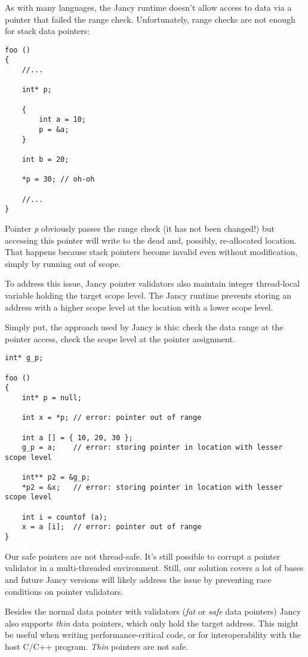 \documentclass[oneside]{book}
\begin{document}
As with many languages, the Jancy runtime doesn't allow access to data via a pointer that failed the range check. Unfortunately, range checks are not enough for stack data pointers:

\begin{lstlisting}
foo ()
{
    //...

    int* p;

    {
        int a = 10;
        p = &a;
    }

    int b = 20;

    *p = 30; // oh-oh

    //...
}
\end{lstlisting}

Pointer \emph{p} obviously passes the range check (it has not been changed!) but accessing this pointer will write to the dead and, possibly, re-allocated location. That happens because stack pointers become invalid even without modification, simply by running out of scope.

To address this issue, Jancy pointer validators also maintain integer thread-local variable holding the target scope level. The Jancy runtime prevents storing an address with a higher scope level at the location with a lower scope level.

Simply put, the approach used by Jancy is this: check the data range at the pointer access, check the scope level at the pointer assignment.

\begin{lstlisting}
int* g_p;

foo ()
{
    int* p = null;

    int x = *p; // error: pointer out of range

    int a [] = { 10, 20, 30 };
    g_p = a;    // error: storing pointer in location with lesser scope level

    int** p2 = &g_p;
    *p2 = &x;   // error: storing pointer in location with lesser scope level

    int i = countof (a);
    x = a [i];  // error: pointer out of range
}
\end{lstlisting}

Our safe pointers are not thread-safe. It's still possible to corrupt a pointer validator in a multi-threaded environment. Still, our solution covers a lot of bases and future Jancy versions will likely address the issue by preventing race conditions on pointer validators.

Besides the normal data pointer with validators (\emph{fat} or \emph{safe} data pointers) Jancy also supports \emph{thin} data pointers, which only hold the target address. This might be useful when writing performance-critical code, or for interoperability with the host C/C++ program. \emph{Thin} pointers are not safe.
\end{document}
